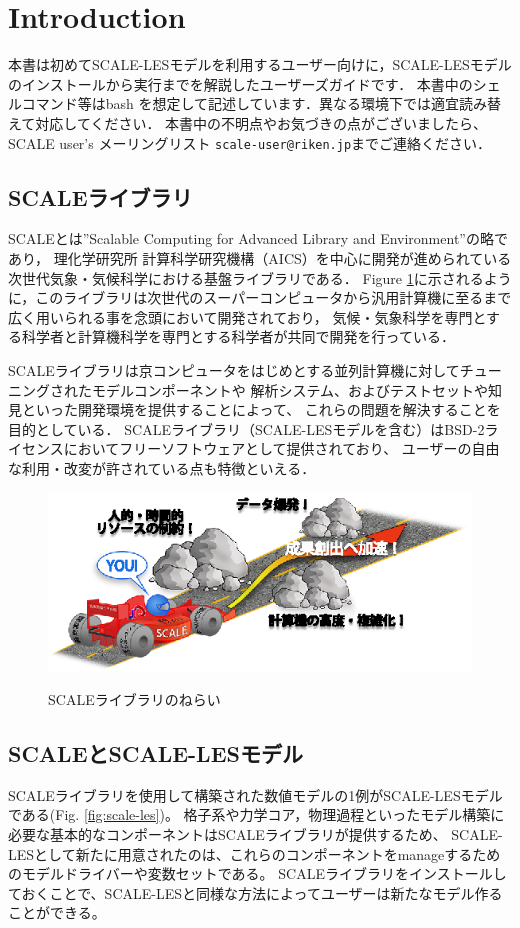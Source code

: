 \section{Introduction}

本書は初めてSCALE-LESモデルを利用するユーザー向けに，SCALE-LESモデルのインストールから実行までを解説したユーザーズガイドです．
本書中のシェルコマンド等はbash を想定して記述しています．異なる環境下では適宜読み替えて対応してください．
本書中の不明点やお気づきの点がございましたら、
SCALE user's メーリングリスト \verb|scale-user@riken.jp|までご連絡ください．

\subsection{SCALEライブラリ}
SCALEとは''Scalable Computing for Advanced Library and Environment''の略であり，
理化学研究所 計算科学研究機構（AICS）を中心に開発が進められている次世代気象・気候科学における基盤ライブラリである．
Figure \ref{fig:scale}に示されるように，このライブラリは次世代のスーパーコンピュータから汎用計算機に至るまで広く用いられる事を念頭において開発されており，
気候・気象科学を専門とする科学者と計算機科学を専門とする科学者が共同で開発を行っている．

SCALEライブラリは京コンピュータをはじめとする並列計算機に対してチューニングされたモデルコンポーネントや
解析システム、およびテストセットや知見といった開発環境を提供することによって、
これらの問題を解決することを目的としている．
SCALEライブラリ（SCALE-LESモデルを含む）はBSD-2ライセンスにおいてフリーソフトウェアとして提供されており、
ユーザーの自由な利用・改変が許されている点も特徴といえる．

\begin{figure}[t]
\begin{center}
  \includegraphics[width=0.6\hsize]{./figure/library.eps}\\
  \caption{SCALEライブラリのねらい}
  \label{fig:scale}
\end{center}
\end{figure}


\subsection{SCALEとSCALE-LESモデル}
SCALEライブラリを使用して構築された数値モデルの1例がSCALE-LESモデルである(Fig. \ref{fig:scale-les})。
格子系や力学コア，物理過程といったモデル構築に必要な基本的なコンポーネントはSCALEライブラリが提供するため、
SCALE-LESとして新たに用意されたのは、これらのコンポーネントをmanageするためのモデルドライバーや変数セットである。
SCALEライブラリをインストールしておくことで、SCALE-LESと同様な方法によってユーザーは新たなモデル作ることができる。

